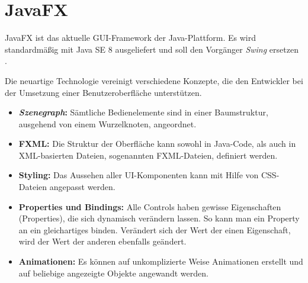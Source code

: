 \section{JavaFX} \label{sec:javaFX}
JavaFX ist das aktuelle GUI-Framework der Java-Plattform. Es wird standardmäßig mit Java SE 8 ausgeliefert und soll den Vorgänger \textit{Swing} ersetzen \cite{Mueller2015}.\par
Die neuartige Technologie vereinigt verschiedene Konzepte, die den Entwickler bei der Umsetzung einer Benutzeroberfläche unterstützen.
\begin{itemize}
	\item \textbf{\textit{Szenegraph}:} Sämtliche Bedienelemente sind in einer Baumstruktur, ausgehend von einem Wurzelknoten, angeordnet.
	\item \textbf{FXML:} Die Struktur der Oberfläche kann sowohl in Java-Code, als auch in XML-basierten Dateien, sogenannten FXML-Dateien, definiert werden.
	\item \textbf{Styling:} Das Aussehen aller UI-Komponenten kann mit Hilfe von CSS-Dateien angepasst werden.
	\item \textbf{Properties und Bindings:} Alle Controls haben gewisse Eigenschaften (Properties), die sich dynamisch verändern lassen. So kann man ein Property an ein gleichartiges binden. Verändert sich der Wert der einen Eigenschaft, wird der Wert der anderen ebenfalls geändert.
		\item \textbf{Animationen:} Es können auf unkomplizierte Weise Animationen erstellt und auf beliebige angezeigte Objekte angewandt werden. \cite{Mueller2015}
\end{itemize}
